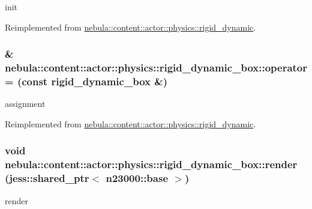 init 

Reimplemented from \hyperlink{classnebula_1_1content_1_1actor_1_1physics_1_1rigid__dynamic_ae9450372c5f60103573ed626ffda9532}{nebula::content::actor::physics::rigid\_\-dynamic}.\hypertarget{classnebula_1_1content_1_1actor_1_1physics_1_1rigid__dynamic__box_a26c54eacc3d28dd0b88e7a67fe6635f7}{
\subsubsection[{operator=}]{\& nebula::content::actor::physics::rigid\_\-dynamic\_\-box::operator= (const {\bf rigid\_\-dynamic\_\-box} \&)}}
\label{classnebula_1_1content_1_1actor_1_1physics_1_1rigid__dynamic__box_a26c54eacc3d28dd0b88e7a67fe6635f7}


assignment 

Reimplemented from \hyperlink{classnebula_1_1content_1_1actor_1_1physics_1_1rigid__dynamic_a115e82dbc90ce5ae9f8d41724f1bd44d}{nebula::content::actor::physics::rigid\_\-dynamic}.\hypertarget{classnebula_1_1content_1_1actor_1_1physics_1_1rigid__dynamic__box_a4125f63982e9dfee274ab2721893bc28}{
\subsubsection[{render}]{\setlength{\rightskip}{0pt plus 5cm}void nebula::content::actor::physics::rigid\_\-dynamic\_\-box::render (jess::shared\_\-ptr$<$ {\bf n23000::base} $>$)}}
\label{classnebula_1_1content_1_1actor_1_1physics_1_1rigid__dynamic__box_a4125f63982e9dfee274ab2721893bc28}


render 

